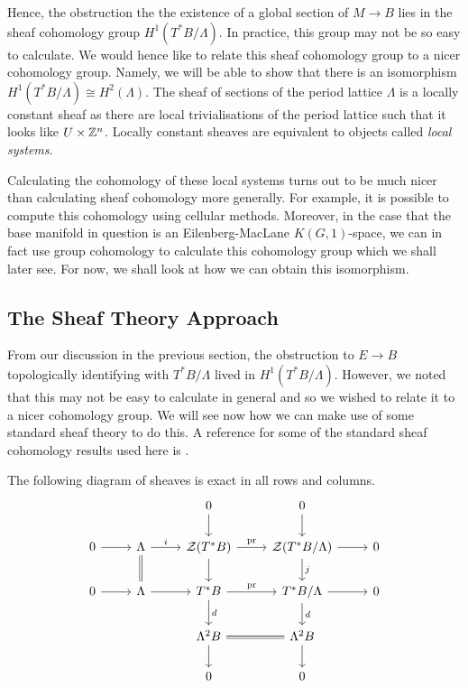 Hence, the obstruction the the existence of a global section of $M \to B$ lies
in the sheaf cohomology group $H^1(T^*B/\Lambda)$. In practice, this group may
not be so easy to calculate. We would hence like to relate this sheaf
cohomology group to a nicer cohomology group. Namely, we will be able to show
that there is an isomorphism $H^1(T^*B/\Lambda) \cong H^2(\Lambda)$. The sheaf
of sections of the period lattice $\Lambda$ is a locally constant sheaf as
there are local trivialisations of the period lattice such that it looks like
$U \times \mathbb{Z}^n$. Locally constant sheaves are equivalent to objects called
\emph{local systems}.

Calculating the cohomology of these local systems turns out to be much nicer
than calculating sheaf cohomology more generally. For example, it is possible
to compute this cohomology using cellular methods. Moreover, in the case that
the base manifold in question is an Eilenberg-MacLane $K(G, 1)$-space, we can
in fact use group cohomology to calculate this cohomology group which we shall
later see. For now, we shall look at how we can obtain this isomorphism.

\subsection{The Sheaf Theory Approach}
From our discussion in the previous section, the obstruction to $E \to B$
topologically identifying with $T^*B/\Lambda$ lived in $H^1(T^*B/\Lambda)$.
However, we noted that this may not be easy to calculate in general and so we
wished to relate it to a nicer cohomology group. We will see now how we can
make use of some standard sheaf theory to do this. A reference for some of the
standard sheaf cohomology results used here is \cite{bredon1997sheaf}.
\begin{lemma}\label{lemma:exact-seq-sheaf}
    The following diagram of sheaves is exact in all rows and columns.
    \[
        \begin{tikzcd}
            & & 0 \arrow[d] & 0 \arrow[d] & \\
            0 \arrow[r] & \Lambda \arrow[r, "i"] \arrow[d, equal]
            & \mathcal{Z}(T^*B) \arrow[r, "\mathrm{pr}"] \arrow[d]
            & \mathcal{Z}(T^*B / \Lambda) \arrow[r] \arrow[d, "j"]
            & 0 \\
            0 \arrow[r] & \Lambda \arrow[r]
            & T^*B \arrow[r, "\mathrm{pr}"] \arrow[d, "d"]
            & T^*B / \Lambda \arrow[r] \arrow[d, "d"]
            & 0 \\
            & & \Lambda^2 B \arrow[r, equal] \arrow[d]
            & \Lambda^2 B \arrow[d] \\
            & & 0 & 0
        \end{tikzcd}
    \]
\end{lemma}

